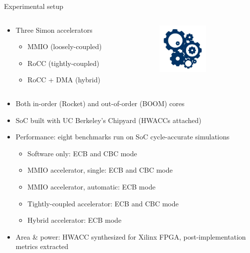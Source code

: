 \documentclass[dvipsnames]{beamer}
\begin{document}
\begin{frame}{Experimental setup}
  \begin{minipage}[0.2\textheight]{\textwidth}
    \begin{columns}[T]
      \begin{column}{0.8\textwidth}
        \begin{itemize}
        \item Three Simon accelerators
        \begin{itemize}
        \item MMIO (loosely-coupled)
        \item RoCC (tightly-coupled)
        \item RoCC + DMA (hybrid)
          \end{itemize}
        \end{itemize}
      \end{column}
      \begin{column}{0.2\textwidth}
        \includegraphics[width=2.5cm]{media/cogs.jpeg}
      \end{column}
    \end{columns}
  \end{minipage}
  \begin{itemize}
  \item Both in-order (Rocket) and out-of-order (BOOM) cores
  \item SoC built with UC Berkeley's Chipyard (HWACCs attached)
  \item Performance: eight benchmarks run on SoC cycle-accurate simulations
    \begin{itemize}
    \item Software only: ECB and CBC mode
    \item MMIO accelerator, single: ECB and CBC mode
    \item MMIO accelerator, automatic: ECB mode
    \item Tightly-coupled accelerator: ECB and CBC mode
    \item Hybrid accelerator: ECB mode
    \end{itemize}
  \item Area \& power: HWACC synthesized for Xilinx FPGA, post-implementation
    metrics extracted
  \end{itemize}
\end{frame}
\end{document}
